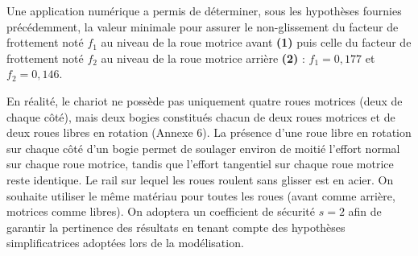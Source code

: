 

Une application numérique a permis de déterminer, sous les hypothèses fournies précédemment, la valeur minimale pour assurer le non-glissement du facteur de frottement noté $f_1$ au niveau de la roue motrice avant \textbf{(1)} puis celle du facteur de frottement noté $f_2$ au niveau de la roue motrice arrière \textbf{(2)} : $f_1=0,177$ et $f_2=0,146$.


En réalité, le chariot ne possède pas uniquement quatre roues motrices (deux de chaque côté), mais deux bogies constitués chacun de deux roues motrices et de deux roues libres en rotation (Annexe 6). La présence d'une roue libre en rotation sur chaque côté d'un bogie permet de soulager environ de moitié l'effort normal sur chaque roue motrice, tandis que l'effort tangentiel sur chaque roue motrice reste identique.
Le rail sur lequel les roues roulent sans glisser est en acier. On souhaite utiliser le même matériau pour toutes les roues (avant comme arrière, motrices comme libres).
On adoptera un coefficient de sécurité $s=2$ afin de garantir la pertinence des résultats en tenant compte des hypothèses simplificatrices adoptées lors de la modélisation.



